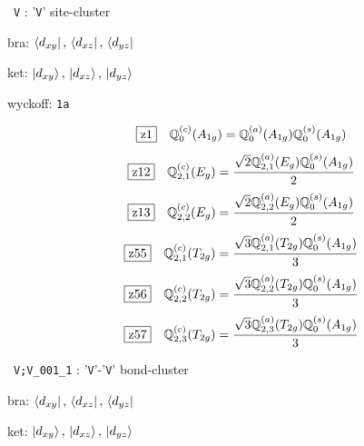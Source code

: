 \documentclass[fleqn,10pt,landscape]{jsarticle}
\begin{document}
\vspace{5mm}

\noindent\textbullet\, \texttt{V} : '\texttt{V}' site-cluster

\noindent\quad * bra: $\bra{d_{xy}},\, \bra{d_{xz}},\, \bra{d_{yz}}$

\noindent\quad * ket: $\ket{d_{xy}},\, \ket{d_{xz}},\, \ket{d_{yz}}$

\noindent\quad * wyckoff: \texttt{1a}

\begin{dmath*}
\hspace*{3mm}\fbox{z1}\quad \mathbb{Q}_{0}^{(c)}(A_{1g})=\mathbb{Q}_{0}^{(a)}(A_{1g}) \mathbb{Q}_{0}^{(s)}(A_{1g})
\end{dmath*}
\begin{dmath*}
\hspace*{3mm}\fbox{z12}\quad \mathbb{Q}_{2,1}^{(c)}(E_{g})=\frac{\sqrt{2} \mathbb{Q}_{2,1}^{(a)}(E_{g}) \mathbb{Q}_{0}^{(s)}(A_{1g})}{2}
\end{dmath*}
\begin{dmath*}
\hspace*{3mm}\fbox{z13}\quad \mathbb{Q}_{2,2}^{(c)}(E_{g})=\frac{\sqrt{2} \mathbb{Q}_{2,2}^{(a)}(E_{g}) \mathbb{Q}_{0}^{(s)}(A_{1g})}{2}
\end{dmath*}
\begin{dmath*}
\hspace*{3mm}\fbox{z55}\quad \mathbb{Q}_{2,1}^{(c)}(T_{2g})=\frac{\sqrt{3} \mathbb{Q}_{2,1}^{(a)}(T_{2g}) \mathbb{Q}_{0}^{(s)}(A_{1g})}{3}
\end{dmath*}
\begin{dmath*}
\hspace*{3mm}\fbox{z56}\quad \mathbb{Q}_{2,2}^{(c)}(T_{2g})=\frac{\sqrt{3} \mathbb{Q}_{2,2}^{(a)}(T_{2g}) \mathbb{Q}_{0}^{(s)}(A_{1g})}{3}
\end{dmath*}
\begin{dmath*}
\hspace*{3mm}\fbox{z57}\quad \mathbb{Q}_{2,3}^{(c)}(T_{2g})=\frac{\sqrt{3} \mathbb{Q}_{2,3}^{(a)}(T_{2g}) \mathbb{Q}_{0}^{(s)}(A_{1g})}{3}
\end{dmath*}
\vspace{5mm}

\noindent\textbullet\, \texttt{V;V_001_1} : '\texttt{V}'-'\texttt{V}' bond-cluster

\noindent\quad * bra: $\bra{d_{xy}},\, \bra{d_{xz}},\, \bra{d_{yz}}$

\noindent\quad * ket: $\ket{d_{xy}},\, \ket{d_{xz}},\, \ket{d_{yz}}$
\end{document}
